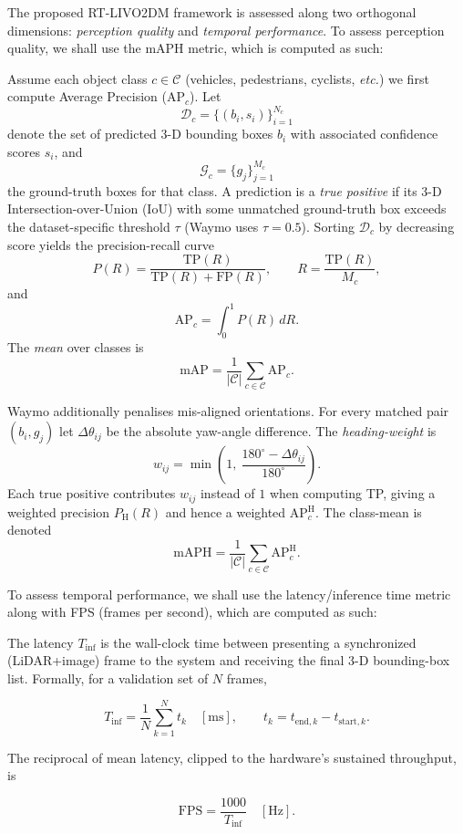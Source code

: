 The proposed RT-LIVO2DM framework is assessed along two orthogonal dimensions: \emph{perception quality} and \emph{temporal performance}. To assess perception quality, we shall use the mAPH metric, which is computed as such: 

Assume each object class $c\in\mathcal{C}$ (vehicles, pedestrians, cyclists, \emph{etc.}) we first compute Average Precision (AP$_c$).  
Let  
\[
\mathcal{D}_c=\{(b_i, s_i)\}_{i=1}^{N_c}
\]  
denote the set of predicted 3-D bounding boxes $b_i$ with associated confidence scores $s_i$, and  
\[
\mathcal{G}_c=\{g_j\}_{j=1}^{M_c}
\]  
the ground-truth boxes for that class.  
A prediction is a \emph{true positive} if its 3-D Intersection-over-Union (IoU) with some unmatched ground-truth box exceeds the dataset-specific threshold $\tau$ (Waymo uses $\tau=0.5$).  
Sorting $\mathcal{D}_c$ by decreasing score yields the precision-recall curve  
\[
P(R)=\frac{\text{TP}(R)}{\text{TP}(R)+\text{FP}(R)},
\qquad
R=\frac{\text{TP}(R)}{M_c},
\]  
and  
\[
\text{AP}_c=\int_0^1 P(R)\,dR.
\]  
The \emph{mean} over classes is  
\[
\text{mAP}= \frac{1}{|\mathcal{C}|}\sum_{c\in\mathcal{C}}\text{AP}_c.
\]

Waymo additionally penalises mis-aligned orientations.  
For every matched pair $(b_i,g_j)$ let $\Delta\theta_{ij}$ be the absolute yaw-angle difference.  
The \emph{heading-weight} is  
\[
w_{ij}= \min\!\left(1,\ \frac{180^\circ-\Delta\theta_{ij}}{180^\circ}\right).
\]  
Each true positive contributes $w_{ij}$ instead of $1$ when computing TP, giving a weighted precision $P_{\text{H}}(R)$ and hence a weighted AP$_c^{\text{H}}$.  
The class-mean is denoted  
\[
\text{mAPH}= \frac{1}{|\mathcal{C}|}\sum_{c\in\mathcal{C}}\text{AP}_c^{\text{H}}.
\]

To assess temporal performance, we shall use the latency/inference time metric along with FPS (frames per second), which are computed as such:

The latency $T_{\text{inf}}$ is the wall-clock time between presenting a synchronized (LiDAR+image) frame to the system and receiving the final 3-D bounding-box list.  
Formally, for a validation set of $N$ frames,

\[
T_{\text{inf}}= \frac{1}{N}\sum_{k=1}^{N}t_k \quad[\text{ms}],
\qquad
t_k = t_{\text{end},k}-t_{\text{start},k}.
\]

The reciprocal of mean latency, clipped to the hardware’s sustained throughput, is

\[
\text{FPS}= \frac{1000}{T_{\text{inf}}} \quad[\text{Hz}].
\]

